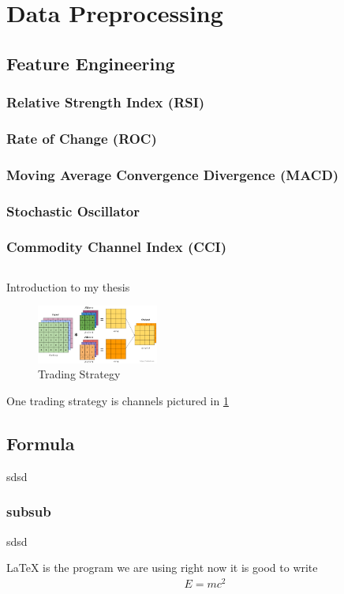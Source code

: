\documentclass[a4paper,12pt]{report}
\begin{document}
	\section{Data Preprocessing}

		\subsection{Feature Engineering}
			\subsubsection{Relative Strength Index (RSI)}
			\subsubsection{Rate of Change (ROC)}
			\subsubsection{Moving Average Convergence Divergence (MACD)}
			\subsubsection{Stochastic Oscillator}
			\subsubsection{Commodity Channel Index (CCI)}

		\subsection{}







Introduction to my thesis
\begin{figure}[h]
\begin{center}
\includegraphics[width=4cm]{images/CNN_filters.png}
\caption{Trading Strategy}
\label{trading_strategy}
\end{center}
\end{figure}

One trading strategy is channels pictured in \ref{trading_strategy}

\subsection{Formula}
sdsd 
\subsubsection{subsub}
sdsd

\LaTeX{} is the program we are using right now
it is good to write 
\begin{align}
E=mc^2
\end{align}
\end{document}
